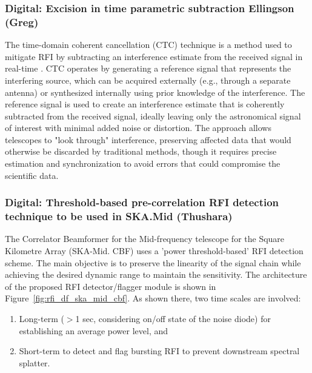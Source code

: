 \subsubsection{Digital: Excision in time parametric subtraction Ellingson (Greg)}

The time-domain coherent cancellation (CTC) technique is a method used to mitigate RFI by subtracting an interference estimate from the received signal in real-time \cite{ellingson2022coherent}. CTC operates by generating a reference signal that represents the interfering source, which can be acquired externally (e.g., through a separate antenna) or synthesized internally using prior knowledge of the interference. The reference signal is used to create an interference estimate that is coherently subtracted from the received signal, ideally leaving only the astronomical signal of interest with minimal added noise or distortion. The approach allows telescopes to "look through" interference, preserving affected data that would otherwise be discarded by traditional methods, though it requires precise estimation and synchronization to avoid errors that could compromise the scientific data.

\subsubsection{Digital: Threshold-based pre-correlation RFI detection technique to be used in SKA.Mid (Thushara)}
\label{subsection:hardware:catalog:ska-mid}

The Correlator Beamformer for the Mid-frequency telescope for the Square Kilometre Array (SKA-Mid. CBF) uses a 'power threshold-based' RFI detection scheme. The main objective is to preserve the linearity of the signal chain while achieving the desired dynamic range to maintain the sensitivity. The architecture of the proposed RFI detector/flagger module is shown in Figure~\ref{fig:rfi_df_ska_mid_cbf}. As shown there, two time scales are involved:
\begin{enumerate}
    \item Long-term ($>$1 sec, considering on/off state of the noise diode) for establishing an average power level, and
    \item Short-term to detect and flag bursting RFI to prevent downstream spectral splatter.
\end{enumerate}

